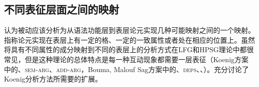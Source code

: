 \begin{exe}
\begin{xlist}[iv.]
\begin{exe}
\begin{xlist}[iv.]
\subsection{不同表征层面之间的映射}
\label{sec-mapping-between-levels}\label{sec-inheritance-passive-SimSyn}

\citet[Chapter~6.3]{CJ2005a}认为被动应该分析为从语法功能层到表层论元实现几种可能映射之间的一个映射。指称论元实现在表层上有一定的格、一定的一致属性或者处在相应的位置上。虽然将具有不同属性的成分映射到不同的表层上的分析方式在LFG和HPSG理论\citep*{Koenig99a,BMS2001a}中都很常见，但是这种理论的总体特点是每一种互动现象都需要一层表征（Koenig方案中的\argstc、\textsc{sem-arg}、\textsc{add-arg}，Bouma, Malouf \biband Sag方案中的\argstc、\textsc{deps}、\sprc、\compsc）。充分讨论了Koenig分析方法所需要的扩展。


\end{xlist}
\end{exe}
\end{xlist}
\end{exe}
